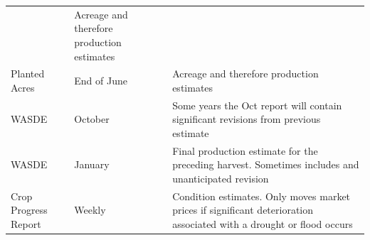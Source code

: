\documentclass[]{book}
\theoremstyle{definition}
\theoremstyle{definition}
\theoremstyle{remark}
\begin{document}
\begin{longtable}[]{@{}lll@{}}
\begin{minipage}[t]{0.10\columnwidth}
\end{minipage} & \begin{minipage}[t]{0.11\columnwidth}\raggedright\strut
Acreage and therefore production estimates\strut
\end{minipage}\tabularnewline
\begin{minipage}[t]{0.11\columnwidth}\raggedright\strut
Planted Acres\strut
\end{minipage} & \begin{minipage}[t]{0.10\columnwidth}\raggedright\strut
End of June\strut
\end{minipage} & \begin{minipage}[t]{0.11\columnwidth}\raggedright\strut
Acreage and therefore production estimates\strut
\end{minipage}\tabularnewline
\begin{minipage}[t]{0.11\columnwidth}\raggedright\strut
WASDE\strut
\end{minipage} & \begin{minipage}[t]{0.10\columnwidth}\raggedright\strut
October\strut
\end{minipage} & \begin{minipage}[t]{0.11\columnwidth}\raggedright\strut
Some years the Oct report will contain significant revisions from
previous estimate\strut
\end{minipage}\tabularnewline
\begin{minipage}[t]{0.11\columnwidth}\raggedright\strut
WASDE\strut
\end{minipage} & \begin{minipage}[t]{0.10\columnwidth}\raggedright\strut
January\strut
\end{minipage} & \begin{minipage}[t]{0.11\columnwidth}\raggedright\strut
Final production estimate for the preceding harvest. Sometimes includes
and unanticipated revision\strut
\end{minipage}\tabularnewline
\begin{minipage}[t]{0.11\columnwidth}\raggedright\strut
Crop Progress Report\strut
\end{minipage} & \begin{minipage}[t]{0.10\columnwidth}\raggedright\strut
Weekly\strut
\end{minipage} & \begin{minipage}[t]{0.11\columnwidth}\raggedright\strut
Condition estimates. Only moves market prices if significant
deterioration associated with a drought or flood occurs\strut
\end{minipage}\tabularnewline
\bottomrule
\end{longtable}
\end{document}
